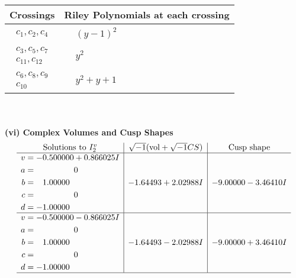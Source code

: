 \documentclass[1p]{elsarticle_modified}
\theoremstyle{definition}
\newcommand{\I}{\sqrt{-1}}
\begin{document}
\begin{tabular}{m{50pt}|m{274pt}}
Crossings & \hspace{64pt}Riley Polynomials at each crossing \\
\hline $$\begin{aligned}c_{1},c_{2},c_{4}\end{aligned}$$&$\begin{aligned}
&(y-1)^2
\end{aligned}$\\
\hline $$\begin{aligned}c_{3},c_{5},c_{7}\\c_{11},c_{12}\end{aligned}$$&$\begin{aligned}
&y^2
\end{aligned}$\\
\hline $$\begin{aligned}c_{6},c_{8},c_{9}\\c_{10}\end{aligned}$$&$\begin{aligned}
&y^2+y+1
\end{aligned}$\\
\hline
\end{tabular}\\~\\
\newpage\flushleft \textbf{(vi) Complex Volumes and Cusp Shapes}
$$\begin{array}{c|c|c}  
\text{Solutions to }I^v_{2}& \I (\text{vol} + \sqrt{-1}CS) & \text{Cusp shape}\\
 \hline 
\begin{aligned}
v &= -0.500000 + 0.866025 I \\
a &= \phantom{-0.000000 } 0 \\
b &= \phantom{-}1.00000\phantom{ +0.000000I} \\
c &= \phantom{-0.000000 } 0 \\
d &= -1.00000\phantom{ +0.000000I}\end{aligned}
 & -1.64493 + 2.02988 I & -9.00000 - 3.46410 I \\ \hline\begin{aligned}
v &= -0.500000 - 0.866025 I \\
a &= \phantom{-0.000000 } 0 \\
b &= \phantom{-}1.00000\phantom{ +0.000000I} \\
c &= \phantom{-0.000000 } 0 \\
d &= -1.00000\phantom{ +0.000000I}\end{aligned}
 & -1.64493 - 2.02988 I & -9.00000 + 3.46410 I\\
 \hline 
 \end{array}$$\newpage\newpage\renewcommand{\arraystretch}{1}
\end{document}
